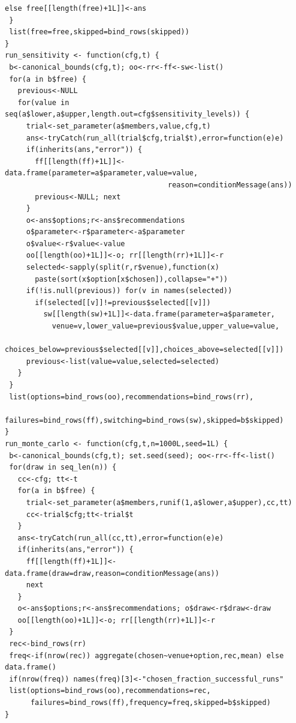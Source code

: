 \begin{lstlisting}[style=Rcode]
   else free[[length(free)+1L]]<-ans
 }
 list(free=free,skipped=bind_rows(skipped))
}
run_sensitivity <- function(cfg,t) {
 b<-canonical_bounds(cfg,t); oo<-rr<-ff<-sw<-list()
 for(a in b$free) {
   previous<-NULL
   for(value in seq(a$lower,a$upper,length.out=cfg$sensitivity_levels)) {
     trial<-set_parameter(a$members,value,cfg,t)
     ans<-tryCatch(run_all(trial$cfg,trial$t),error=function(e)e)
     if(inherits(ans,"error")) {
       ff[[length(ff)+1L]]<-data.frame(parameter=a$parameter,value=value,
                                      reason=conditionMessage(ans))
       previous<-NULL; next
     }
     o<-ans$options;r<-ans$recommendations
     o$parameter<-r$parameter<-a$parameter
     o$value<-r$value<-value
     oo[[length(oo)+1L]]<-o; rr[[length(rr)+1L]]<-r
     selected<-sapply(split(r,r$venue),function(x)
       paste(sort(x$option[x$chosen]),collapse="+"))
     if(!is.null(previous)) for(v in names(selected))
       if(selected[[v]]!=previous$selected[[v]])
         sw[[length(sw)+1L]]<-data.frame(parameter=a$parameter,
           venue=v,lower_value=previous$value,upper_value=value,
           choices_below=previous$selected[[v]],choices_above=selected[[v]])
     previous<-list(value=value,selected=selected)
   }
 }
 list(options=bind_rows(oo),recommendations=bind_rows(rr),
      failures=bind_rows(ff),switching=bind_rows(sw),skipped=b$skipped)
}
run_monte_carlo <- function(cfg,t,n=1000L,seed=1L) {
 b<-canonical_bounds(cfg,t); set.seed(seed); oo<-rr<-ff<-list()
 for(draw in seq_len(n)) {
   cc<-cfg; tt<-t
   for(a in b$free) {
     trial<-set_parameter(a$members,runif(1,a$lower,a$upper),cc,tt)
     cc<-trial$cfg;tt<-trial$t
   }
   ans<-tryCatch(run_all(cc,tt),error=function(e)e)
   if(inherits(ans,"error")) {
     ff[[length(ff)+1L]]<-data.frame(draw=draw,reason=conditionMessage(ans))
     next
   }
   o<-ans$options;r<-ans$recommendations; o$draw<-r$draw<-draw
   oo[[length(oo)+1L]]<-o; rr[[length(rr)+1L]]<-r
 }
 rec<-bind_rows(rr)
 freq<-if(nrow(rec)) aggregate(chosen~venue+option,rec,mean) else data.frame()
 if(nrow(freq)) names(freq)[3]<-"chosen_fraction_successful_runs"
 list(options=bind_rows(oo),recommendations=rec,
      failures=bind_rows(ff),frequency=freq,skipped=b$skipped)
}
\end{lstlisting}
